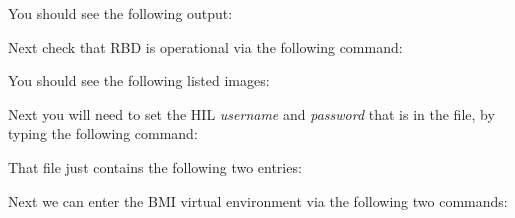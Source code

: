 
You should see the following output: 


Next check that RBD is operational via the following command: 


\pagebreak

You should see the following listed images: 



Next you will need to set the HIL \emph{username} and \emph{password} that is in the  file, by typing the following command:


That file just contains the following two entries: 



Next we can enter the BMI virtual environment via the following two commands: 


